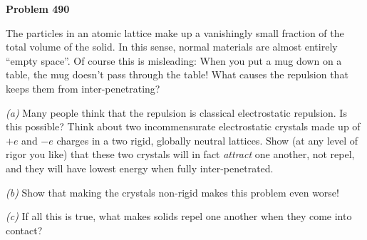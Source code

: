 \documentclass[12pt]{article}
\begin{document}
\begin{pottproblem}
\textbf{Problem 490}

The particles in an atomic lattice make up a vanishingly small fraction
of the total volume of the solid.
In this sense, normal materials are almost entirely ``empty space''.
Of course this is misleading:
When you put a mug down on a table, the mug doesn't pass through the table!
What causes the repulsion that keeps them from inter-penetrating?

\textsl{(a)} Many people think that the repulsion is classical electrostatic repulsion.
Is this possible?
Think about two incommensurate electrostatic crystals made up of $+e$ and $-e$ charges
in a two rigid, globally neutral lattices.
Show (at any level of rigor you like) that these two crystals will in fact \emph{attract}
one another, not repel, and they will have lowest energy when fully inter-penetrated.

\textsl{(b)} Show that making the crystals non-rigid makes this
problem even worse!

\textsl{(c)} If all this is true, what makes solids repel one another when they come into contact?

\end{pottproblem}
\end{document}
